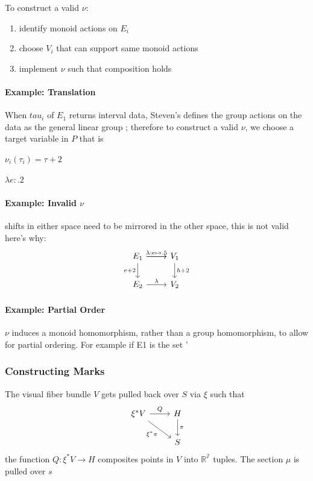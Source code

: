 \documentclass[../main.tex]{subfiles}
\begin{document}
To construct a valid $\nu$:
\begin{enumerate}
    \item identify monoid actions on $E_i$
    \item choose $V_i$ that can support same monoid actions
    \item implement $\nu$ such that composition holds
\end{enumerate}

\paragraph{Example: Translation}
When $tau_{i}$ of $E_1$ returns interval data, Steven's defines the group actions on the data as the general linear group \cite{stevensTheoryScalesMeasurement1946,leaFormalizationMeasurementScale}; therefore to construct a valid $\nu$, we choose a target variable in $P$ that is

$\nu_i(\tau_i) = \tau + 2$

$\lambda e: .2$ 
\paragraph{Example: Invalid $\nu$}
shifts in either space need to be mirrored in the other space, this is not valid  here's why:
\begin{equation}
    \label{eq:nu_equation_bad}
    \begin{tikzcd}
        E_1 \arrow[r] \arrow[r, "\lambda:e\mapsto.5"] \arrow[d, "e+2"'] & V_1 \arrow[d, "h+2"] \\
        E_2 \arrow[r, "\lambda"]                                        & V_2                 
    \end{tikzcd}
\end{equation}

\paragraph{Example: Partial Order}
$\nu$ induces a monoid homomorphism, rather than a group homomorphism, to allow for partial ordering. For example if E1 is the set '{} 



\subsubsection{Constructing Marks}
The visual fiber bundle $V$ gets pulled back over $S$ via $\xi$ such that 
\begin{equation}
    \begin{tikzcd}
        \xi^*V \arrow[r, "Q"] \arrow[rd, "\xi^*\pi"'] & H \arrow[d, "\pi"] \\
                                                      & S                 
    \end{tikzcd}
\end{equation}
the function $Q:\xi^*V\rightarrow H$ composites points in $V$ into $\mathbb{R^7}$ tuples. The section $\mu$ is pulled over $s$ 
\end{document}
